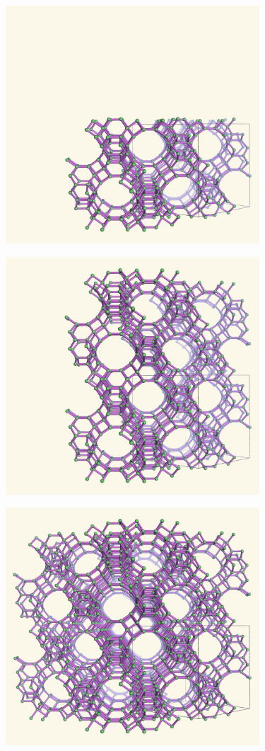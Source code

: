 \documentclass{beamer}
\begin{document}
\begin{frame}
  \begin{center}
    \includegraphics[height=3.5in]{fau-211}
  \end{center}
\end{frame}

\begin{frame}
  \begin{center}
    \includegraphics[height=3.5in]{fau-221}
  \end{center}
\end{frame}

\begin{frame}
  \begin{center}
    \includegraphics[height=3.5in]{fau-222}
  \end{center}
\end{frame}
\end{document}

